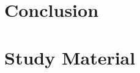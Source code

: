 \documentclass[logo,msc]{infthesis}
\begin{document}
\chapter{Conclusion}

%




%


\appendix

\chapter{Study Material}
\end{document}

